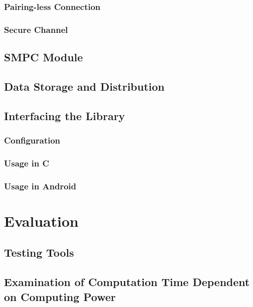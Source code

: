 			\subsection*{Pairing-less Connection}
			
			\subsection*{Secure Channel}
			
	\section{\gls{SMPC} Module}
	
	\section{Data Storage and Distribution}
	
	\section{Interfacing the Library}
	
		\subsection*{Configuration}
		
		\subsection*{Usage in C}
		
		\subsection*{Usage in Android}
		
\chapter{Evaluation }

	\section{Testing Tools}
	

	\section{Examination of Computation Time Dependent on Computing Power}
	
